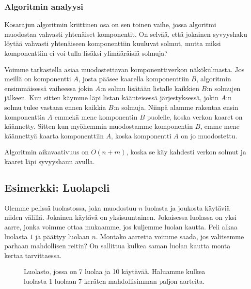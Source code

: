\subsubsection{Algoritmin analyysi}

Kosarajun algoritmin kriittinen osa on sen toinen vaihe,
jossa algoritmi muodostaa vahvasti yhtenäiset komponentit.
On selvää, että jokainen syvyyshaku löytää
vahvasti yhtenäiseen komponenttiin kuuluvat solmut,
mutta miksi komponenttiin ei voi tulla lisäksi ylimääräisiä solmuja?

Voimme tarkastella asiaa muodostettavan
komponenttiverkon näkökul\-masta.
Jos meillä on komponentti $A$, josta pääsee kaarella
komponenttiin $B$, 
algoritmin ensimmäisessä vaiheessa
jokin $A$:n solmu lisätään listalle kaikkien $B$:n
solmujen jälkeen.
Kun sitten käymme läpi listan käänteisessä järjestyk\-sessä,
jokin $A$:n solmu tulee vastaan ennen kaikkia $B$:n
solmuja.
Niinpä alamme rakentaa ensin komponenttia $A$
emmekä mene komponentin $B$ puolelle,
koska verkon kaaret on käännetty.
Sitten kun myöhemmin muodostamme komponentin $B$,
emme mene käännettyä kaarta komponenttiin $A$,
koska komponentti $A$ on jo muodostettu.

Algoritmin aikavaativuus on $O(n+m)$,
koska se käy kahdesti verkon solmut ja kaaret läpi syvyyshaun avulla.

\subsection{Esimerkki: Luolapeli}

Olemme pelissä luolastossa, joka muodostuu $n$ luolasta ja
joukosta käytäviä niiden välillä.
Jokainen käytävä on yksisuuntainen.
Jokaisessa luolassa on yksi aarre, jonka voimme ottaa mukaamme,
jos kuljemme luolan kautta.
Peli alkaa luolasta $1$ ja päättyy luolaan $n$.
Montako aarretta voimme saada, jos valitsemme parhaan
mahdollisen reitin?
On sallittua kulkea saman luolan kautta monta kertaa tarvittaessa.

\begin{figure}
\center
\begin{center}
\end{center}
\caption{Luolasto, jossa on 7 luolaa ja 10 käytävää.
Haluamme kulkea luolasta 1 luolaan 7 keräten mahdollisimman paljon aarteita.}
\label{fig:luopel}
\end{figure}

